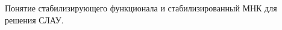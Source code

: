 \documentclass[__main__.tex]{subfiles}
\begin{document}
Понятие стабилизирующего функционала и стабилизированный МНК для решения СЛАУ.
\end{document}
